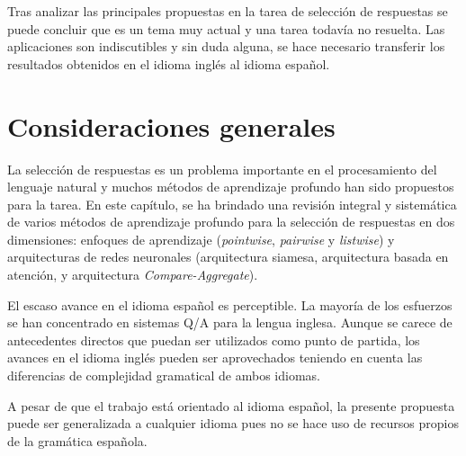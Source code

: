 Tras analizar las principales propuestas en la tarea de selección de respuestas se puede concluir que es un tema muy actual y una tarea todavía no resuelta. Las aplicaciones son indiscutibles y sin duda alguna, se hace necesario transferir los resultados obtenidos en el idioma inglés al idioma español.


\section{Consideraciones generales}

La selección de respuestas es un problema importante en el procesamiento del lenguaje natural y muchos métodos de aprendizaje profundo han sido propuestos para la tarea. En este capítulo, se ha brindado una revisión integral y sistemática de varios métodos de aprendizaje profundo para la selección de respuestas en dos dimensiones: enfoques de aprendizaje (\textit{pointwise}, \textit{pairwise} y \textit{listwise}) y arquitecturas de redes neuronales (arquitectura siamesa, arquitectura basada en atención, y arquitectura \textit{Compare-Aggregate}).

El escaso avance en el idioma español es perceptible. La mayoría de los esfuerzos se han concentrado en sistemas Q/A para la lengua inglesa. Aunque se carece de antecedentes directos que puedan ser utilizados como punto de partida, los avances en el idioma inglés pueden ser aprovechados teniendo en cuenta las diferencias de complejidad gramatical de ambos idiomas.

A pesar de que el trabajo está orientado al idioma español, la presente propuesta puede ser generalizada a cualquier idioma pues no se hace uso de recursos propios de la gramática española.